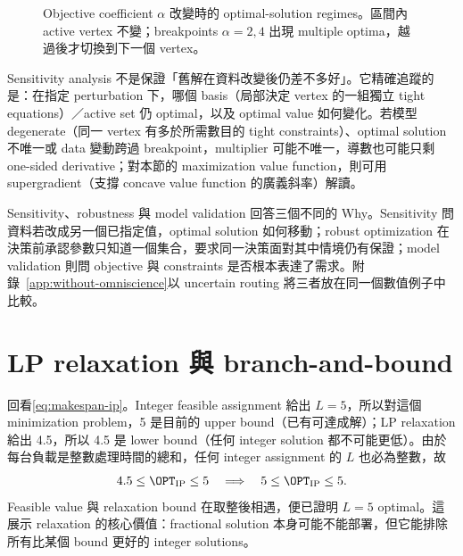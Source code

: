 \documentclass[11pt,a4paper,oneside,openany]{book}
\begin{document}
\begin{figure}[htbp]
\centering
{}
\caption{Objective coefficient $\alpha$ 改變時的 optimal-solution regimes。區間內 active vertex 不變；breakpoints $\alpha=2,4$ 出現 multiple optima，越過後才切換到下一個 vertex。}
\label{fig:objective-sensitivity}
\end{figure}

\begin{misconception}
Sensitivity analysis 不是保證「舊解在資料改變後仍差不多好」。它精確追蹤的是：在指定 perturbation 下，哪個 basis（局部決定 vertex 的一組獨立 tight equations）／active set 仍 optimal，以及 optimal value 如何變化。若模型 degenerate（同一 vertex 有多於所需數目的 tight constraints）、optimal solution 不唯一或 data 變動跨過 breakpoint，multiplier 可能不唯一，導數也可能只剩 one-sided derivative；對本節的 maximization value function，則可用 supergradient（支撐 concave value function 的廣義斜率）解讀。
\end{misconception}

Sensitivity、robustness 與 model validation 回答三個不同的 Why。Sensitivity 問資料若改成另一個已指定值，optimal solution 如何移動；robust optimization 在決策前承認參數只知道一個集合，要求同一決策面對其中情境仍有保證；model validation 則問 objective 與 constraints 是否根本表達了需求。附錄~\ref{app:without-omniscience}以 uncertain routing 將三者放在同一個數值例子中比較。

\section{LP relaxation 與 branch-and-bound}
回看\cref{eq:makespan-ip}。Integer feasible assignment 給出 $L=5$，所以對這個 minimization problem，5 是目前的 upper bound（已有可達成解）；LP relaxation 給出 4.5，所以 4.5 是 lower bound（任何 integer solution 都不可能更低）。由於每台負載是整數處理時間的總和，任何 integer assignment 的 $L$ 也必為整數，故
\[
 4.5\le \OPT_{\mathrm{IP}}\le5
 \quad\Longrightarrow\quad
 5\le \OPT_{\mathrm{IP}}\le5.
\]
Feasible value 與 relaxation bound 在取整後相遇，便已證明 $L=5$ optimal。這展示 relaxation 的核心價值：fractional solution 本身可能不能部署，但它能排除所有比某個 bound 更好的 integer solutions。
\end{document}
